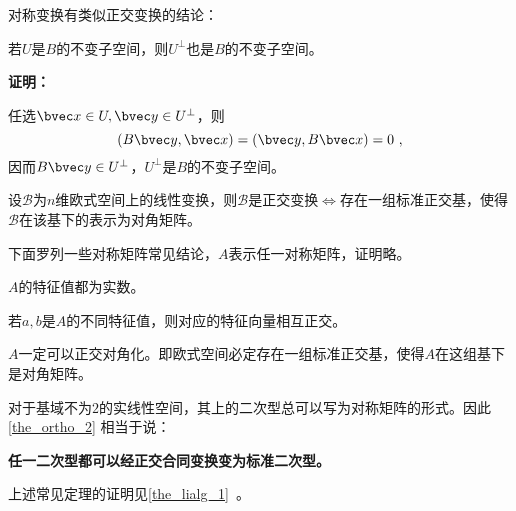 对称变换有类似正交变换的结论：
\begin{theorem}{}
若$U$是$B$的不变子空间，则$U^{\bot}$也是$B$的不变子空间。
\end{theorem}
\textbf{证明：}

任选$\bvec x\in U,\bvec y\in U^{\bot}$，则
\begin{equation}
(B\bvec y,\bvec x)=(\bvec y,B\bvec x)=0~,
\end{equation}
因而$B\bvec y\in U^{\bot}$，$ U^{\bot}$是$B$的不变子空间。
\begin{exercise}{}
设$\mathcal B$为$n$维欧式空间上的线性变换，则$\mathcal B$是正交变换$\Longleftrightarrow$存在一组标准正交基，使得$\mathcal B$在该基下的表示为对角矩阵。
\end{exercise}
下面罗列一些对称矩阵常见结论，$A$表示任一对称矩阵，证明略。
\begin{theorem}{}
$A$的特征值都为实数。
\end{theorem}
\begin{theorem}{}
若$a,b$是$A$的不同特征值，则对应的特征向量相互正交。
\end{theorem}
\begin{theorem}{}\label{the_ortho_2}
$A$一定可以正交对角化。即欧式空间必定存在一组标准正交基，使得$A$在这组基下是对角矩阵。
\end{theorem}
对于基域不为$2$的实线性空间，其上的二次型总可以写为对称矩阵的形式。因此\autoref{the_ortho_2} 相当于说：

\textbf{任一二次型都可以经正交合同变换变为标准二次型。}

上述常见定理的证明见\autoref{the_lialg_1}~。